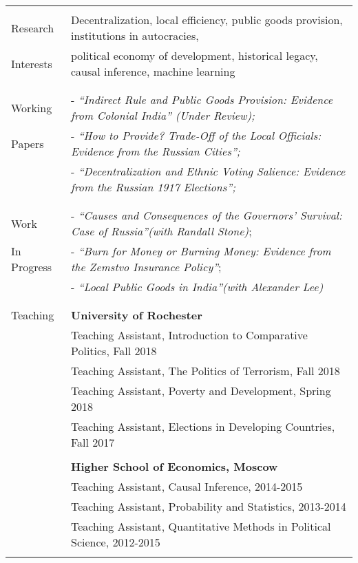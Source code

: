 \documentclass[letterpaper,11pt,oneside]{article}
\begin{document}
\begin{tabular}{@{} l l}
&\\
\Large{Research} & Decentralization, local efficiency, public goods provision,  institutions in autocracies,  \\
\Large{Interests} &political economy of development, historical legacy, causal inference, machine learning\\
 & \\
&\\
\Large{Working}
 & - \textit{``Indirect Rule and Public Goods Provision:
 	Evidence from Colonial India'' (Under Review);}\\
 \Large{Papers}
 &- \textit{``How to Provide? Trade-Off of the Local Officials: Evidence from the Russian Cities'';}\\
 & - \textit{``Decentralization and Ethnic Voting Salience: Evidence from the Russian 1917 Elections'';}\\
  & \\
 &\\
 \Large{Work}
 &- \textit{``Causes and Consequences of the Governors' Survival: Case of Russia''(with Randall Stone)};\\
 \Large{In Progress}
 &- \textit{``Burn for Money or Burning Money: Evidence from the Zemstvo Insurance Policy''};\\
  &- \textit{``Local Public Goods in India''(with Alexander Lee)}\\
&\\
&\\
 \Large{Teaching}  
 &\textbf{University of Rochester} \\
 & Teaching Assistant, Introduction to Comparative Politics, Fall 2018 \\
 & Teaching Assistant, The Politics of Terrorism, Fall 2018 \\
 & Teaching Assistant, Poverty and Development, Spring 2018 \\
  & Teaching Assistant, Elections in Developing Countries, Fall 2017 \\
  \\
     &\textbf{Higher School of Economics, Moscow} \\
     & Teaching Assistant, Causal Inference, 2014-2015 \\
     & Teaching Assistant, Probability and Statistics, 2013-2014 \\
     & Teaching Assistant, Quantitative Methods in Political Science, 2012-2015 \\
    &\\ 



\end{tabular}
\end{document}
